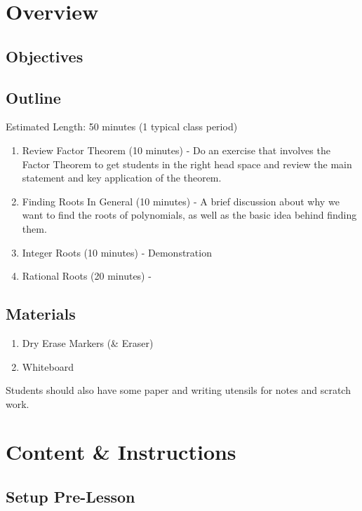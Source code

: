 \section{Overview}

\subsection{Objectives}



\subsection{Outline}

Estimated Length: 50 minutes (1 typical class period)

\begin{enumerate}
    \item Review Factor Theorem (10 minutes) - Do an exercise that involves the Factor Theorem to get students in the right head space and review the main statement and key application of the theorem.
    \item Finding Roots In General (10 minutes) - A brief discussion about why we want to find the roots of polynomials, as well as the basic idea behind finding them.
    \item Integer Roots (10 minutes) - Demonstration
    \item Rational Roots (20 minutes) - 
\end{enumerate}

\subsection{Materials}

\begin{enumerate}
    \item Dry Erase Markers (\& Eraser)
    \item Whiteboard
\end{enumerate}

Students should also have some paper and writing utensils for notes and scratch work.


\newpage

\section{Content \& Instructions}

\setcounter{subsection}{-1}

\subsection{Setup Pre-Lesson}


